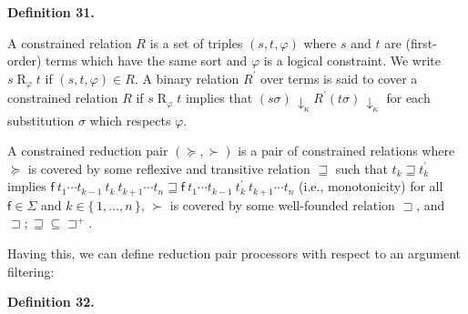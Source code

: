 \documentclass[10pt,a4paper]{amsart}
\begin{document}
 
 
\par\medskip\noindent\textbf{Definition 31.}\par
 
 
A constrained relation $R$ is a set of triples $(s,t,\varphi)$ where $s$ and $t$ are (first-order) terms which have the same sort and $\varphi$ is a logical constraint. We write ${s}\mathrel{R}_{\varphi}{t}$ if $(s,t,\varphi)\in R$. A binary relation $R^{\prime}$ over terms is said to cover a constrained relation $R$ if ${s}\mathrel{R}_{\varphi}{t}$ implies that $(s\sigma)\,{\downarrow}_{\kappa}\mathrel{R^{\prime}}(t\sigma)\,{\downarrow}_{\kappa}$ for each substitution $\sigma$ which respects $\varphi$.\par
 
 
 
A constrained reduction pair $(\succeq,\succ)$ is a pair of constrained relations where $\succeq$ is covered by some reflexive and transitive relation $\sqsupseteq$ such that $t_{k}\sqsupseteq t_{k}^{\prime}$ implies ${{{\mathsf{f}}\ {{t}_{1}\cdots{t}_{k-1}}}\ {t_{k}}}\ {{t}_{k+1}\cdots{t}_{n}}\sqsupseteq{{{\mathsf{f}}\ {{t}_{1}\cdots{t}_{k-1}}}\ {t_{k}^{\prime}}}\ {{t}_{k+1}\cdots{t}_{n}}$ (i.e., monotonicity) for all $\mathsf{f}\in\Sigma$ and $k\in\{\,1,\ldots,n\,\}$, $\succ$ is covered by some well-founded relation $\sqsupset$, and ${\sqsupset}\mathrel{;}{\sqsupseteq}\subseteq{\sqsupset^{+}}$.\par
 
 
 
 
Having this, we can define reduction pair processors with respect to an argument filtering:\par
 
 
 
\par\medskip\noindent\textbf{Definition 32.}\par
 
 
\end{document}
